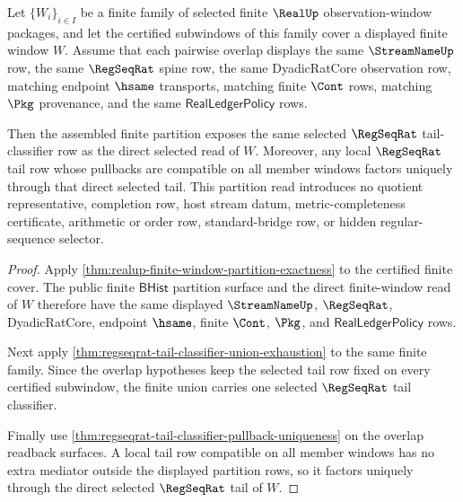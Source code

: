 \begin{theorem}
\label{thm:regseqrat-tail-classifier-partition-coherence}
Let $\{W_i\}_{i\in I}$ be a finite family of selected finite $\RealUp$
observation-window packages, and let the certified subwindows of this family
cover a displayed finite window $W$. Assume that each pairwise overlap displays
the same $\StreamNameUp$ row, the same $\RegSeqRat$ spine row, the same
DyadicRatCore observation row, matching endpoint $\hsame$ transports, matching
finite $\Cont$ rows, matching $\Pkg$ provenance, and the same
$\mathsf{RealLedgerPolicy}$ rows.

Then the assembled finite partition exposes the same selected $\RegSeqRat$
tail-classifier row as the direct selected read of $W$. Moreover, any local
$\RegSeqRat$ tail row whose pullbacks are compatible on all member windows
factors uniquely through that direct selected tail. This partition read
introduces no quotient representative, completion row, host stream datum,
metric-completeness certificate, arithmetic or order row, standard-bridge row,
or hidden regular-sequence selector.
\end{theorem}
\begin{proof}
Apply \autoref{thm:realup-finite-window-partition-exactness} to the certified
finite cover. The public finite $\mathsf{BHist}$ partition surface and the
direct finite-window read of $W$ therefore have the same displayed
$\StreamNameUp$, $\RegSeqRat$, DyadicRatCore, endpoint $\hsame$, finite
$\Cont$, $\Pkg$, and $\mathsf{RealLedgerPolicy}$ rows.

Next apply \autoref{thm:regseqrat-tail-classifier-union-exhaustion} to the
same finite family. Since the overlap hypotheses keep the selected tail row
fixed on every certified subwindow, the finite union carries one selected
$\RegSeqRat$ tail classifier.

Finally use \autoref{thm:regseqrat-tail-classifier-pullback-uniqueness} on the
overlap readback surfaces. A local tail row compatible on all member windows
has no extra mediator outside the displayed partition rows, so it factors
uniquely through the direct selected $\RegSeqRat$ tail of $W$.
\end{proof}

